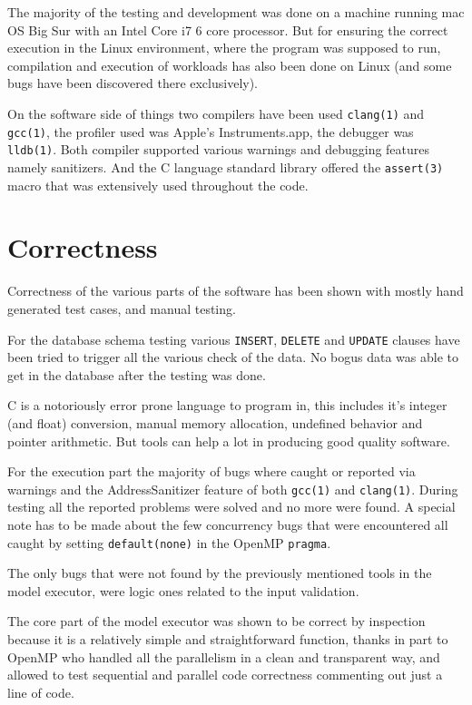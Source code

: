 \documentclass[Lau]{sapthesis} %
\let\oldsection\section
\def\subsection{\oldsection}
\def\section{\chapter}
\begin{document}
The majority of the testing and development was done on a machine running mac OS
Big Sur with an Intel Core i7 6 core processor. But for ensuring the correct
execution in the Linux environment, where the program was supposed to run,
compilation and execution of workloads has also been done on Linux (and some
bugs have been discovered there exclusively).

On the software side of things two compilers have been used \texttt{clang(1)}
and \texttt{gcc(1)}, the profiler used was Apple's Instruments.app, the debugger
was \texttt{lldb(1)}. Both compiler supported various warnings and debugging
features namely sanitizers. And the C language standard library offered the
\texttt{assert(3)} macro that was extensively used throughout the code.

\subsection{Correctness}

Correctness of the various parts of the software has been shown with mostly hand
generated test cases, and manual testing.

For the database schema testing various \texttt{INSERT}, \texttt{DELETE} and
\texttt{UPDATE} clauses have been tried to trigger all the various check of the
data. No bogus data was able to get in the database after the testing was done.

C is a notoriously error prone language to program in, this includes
it's integer (and float) conversion, manual memory allocation,
undefined behavior and pointer arithmetic. But tools can help a
lot in producing good quality software.

For the execution part the majority of bugs where caught or reported via
warnings and the AddressSanitizer \cite{asan} feature of both \texttt{gcc(1)}
and \texttt{clang(1)}. During testing all the reported problems were solved and
no more were found. A special note has to be made about the few concurrency bugs
that were encountered all caught by setting \texttt{default(none)} in the OpenMP
\texttt{pragma}.

The only bugs that were not found by the previously mentioned tools in the model
executor, were logic ones related to the input validation.

The core part of the model executor was shown to be correct by inspection
because it is a relatively simple and straightforward function, thanks in part
to OpenMP who handled all the parallelism in a clean and transparent way, and
allowed to test sequential and parallel code correctness commenting out just a
line of code.
\end{document}
